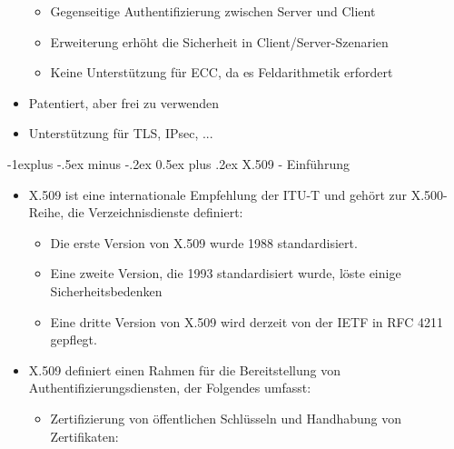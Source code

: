 \documentclass[a4paper]{article}
\makeatletter
\renewcommand{\subsection}{\@startsection{subsection}{2}{0mm}%
 {-1explus -.5ex minus -.2ex}%
 {0.5ex plus .2ex}%
 {\normalfont\normalsize\bfseries}}
\makeatother
\begin{document}
\begin{multicols}{3}
\begin{itemize}
              \begin{itemize}
                  \item
                        Gegenseitige Authentifizierung zwischen Server und Client
                  \item
                        Erweiterung erhöht die Sicherheit in Client/Server-Szenarien
                  \item
                        Keine Unterstützung für ECC, da es Feldarithmetik erfordert
              \end{itemize}
        \item
              Patentiert, aber frei zu verwenden
        \item
              Unterstützung für TLS, IPsec, ...
    \end{itemize}


    \subsection{X.509 - Einführung}

    \begin{itemize}
        \item
              X.509 ist eine internationale Empfehlung der ITU-T und gehört zur
              X.500-Reihe, die Verzeichnisdienste definiert:

              \begin{itemize}
                  \item
                        Die erste Version von X.509 wurde 1988 standardisiert.
                  \item
                        Eine zweite Version, die 1993 standardisiert wurde, löste einige
                        Sicherheitsbedenken
                  \item
                        Eine dritte Version von X.509 wird derzeit von der IETF in RFC 4211
                        gepflegt.
              \end{itemize}
        \item
              X.509 definiert einen Rahmen für die Bereitstellung von
              Authentifizierungsdiensten, der Folgendes umfasst:

              \begin{itemize}
                  \item
                        Zertifizierung von öffentlichen Schlüsseln und Handhabung von
                        Zertifikaten:


\end{itemize}
\end{itemize}
\end{multicols}
\end{document}
